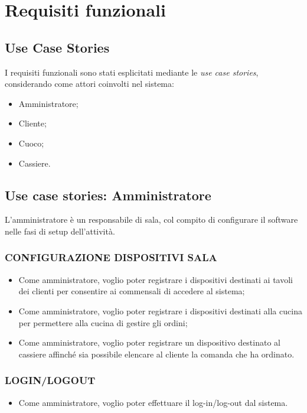 \section{Requisiti funzionali}

\subsection{Use Case Stories}

I requisiti funzionali sono stati esplicitati mediante le \textit{use case stories}, considerando come attori coinvolti nel sistema: 
\begin{itemize}
	\item Amministratore;
	\item Cliente;
	\item Cuoco;
	\item Cassiere.
\end{itemize}


\subsection{Use case stories: Amministratore}
L’amministratore è un responsabile di sala, col compito di configurare il software nelle fasi di setup dell’attività.
\subsubsection{CONFIGURAZIONE DISPOSITIVI SALA} 
\begin{itemize}
	\item Come amministratore, voglio poter registrare i dispositivi destinati ai tavoli dei clienti per consentire ai commensali di accedere al sistema;
	\item Come amministratore, voglio poter registrare i dispositivi destinati alla cucina per permettere alla cucina di gestire gli ordini;
	\item Come amministratore, voglio poter registrare un dispositivo destinato al cassiere affinché sia possibile elencare al cliente la comanda che ha ordinato.
\end{itemize}

\subsubsection{LOGIN/LOGOUT} 
\begin{itemize}
	\item Come amministratore, voglio poter effettuare il log-in/log-out dal sistema.
\end{itemize}

